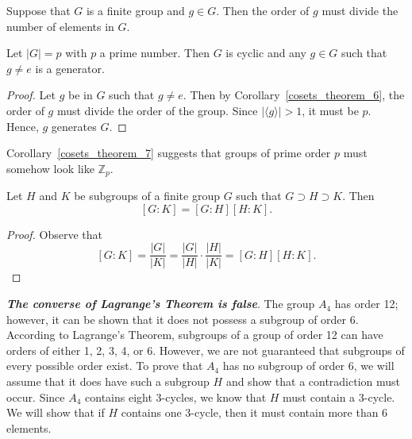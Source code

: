\begin{corollary}\label{cosets_theorem_6}
Suppose that $G$ is a finite group and $g \in G$.  Then the order of $g$ must divide the number of elements in $G$. 
\end{corollary}

\begin{corollary}\label{cosets_theorem_7}
Let $|G| = p$ with $p$ a prime number.  Then $G$ is cyclic and any $g \in G$ such that $g \neq e$ is a generator. 
\end{corollary}

 
\begin{proof}
Let $g$ be in $G$ such that $g \neq e$.  Then by Corollary~\ref{cosets_theorem_6}, the order of $g$ must divide the order of the group. Since $|\langle g \rangle| > 1$, it must be $p$.  Hence, $g$ generates $G$. 
\end{proof}

\medskip

Corollary~\ref{cosets_theorem_7} suggests that groups of prime order $p$ must somehow look like ${\mathbb Z}_p$. 

\begin{corollary}\label{cosets_theorem_8}
Let $H$ and $K$ be subgroups of a finite group $G$ such that $G \supset H \supset K$.  Then 
\[
[G:K] = [G:H][H:K].
\]
\end{corollary}
 
\begin{proof}
Observe that
\[
[G:K] = \frac{|G|}{|K|} = \frac{|G|}{|H|} \cdot
\frac{|H|}{|K|} = [G:H][H:K].
\]
\end{proof}

\medskip
 
\textbf\emph{The converse of Lagrange's Theorem is false}.  The group $A_4$ has order 12; however, it can be shown that it does not possess a subgroup of order 6.  According to Lagrange's Theorem, subgroups of a group of order 12 can have orders of either 1, 2, 3, 4, or  6.  However, we are not guaranteed that subgroups of every possible order exist.  To prove that $A_4$ has no subgroup of order 6, we will assume that it does have such a subgroup $H$ and show that a contradiction must occur.  Since $A_4$ contains eight 3-cycles, we know that $H$ must contain a 3-cycle.  We will show that if $H$ contains one 3-cycle, then it must contain more than 6 elements.




